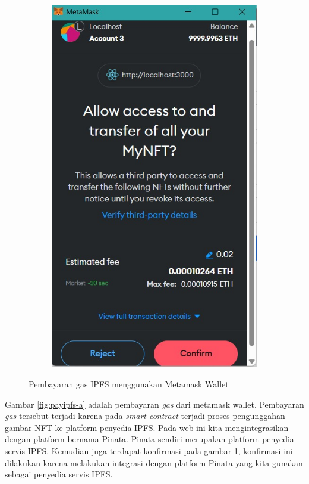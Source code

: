 \begin{figure} [H]
\begin{subfigure}{0.45\textwidth}
    \includegraphics[scale=0.32]{gambar/confirm_upload.jpg}
    \caption{}
    \label{fig:payipfs-b}
\end{subfigure}
  \caption{Pembayaran gas IPFS menggunakan Metamask Wallet}
  \label{fig:koneksi_web_metamask}
  \end{figure}
  
    Gambar \ref{fig:payipfs-a} adalah pembayaran \emph{gas} dari metamask wallet. Pembayaran \emph{gas} tersebut terjadi karena pada \emph{smart contract} terjadi proses pengunggahan gambar NFT ke platform penyedia IPFS. Pada web ini kita mengintegrasikan dengan platform bernama Pinata. Pinata sendiri merupakan platform penyedia servis IPFS. Kemudian juga terdapat konfirmasi pada gambar \ref{fig:payipfs-b}, konfirmasi ini dilakukan karena melakukan integrasi dengan platform Pinata yang kita gunakan sebagai penyedia servis IPFS. 
    
